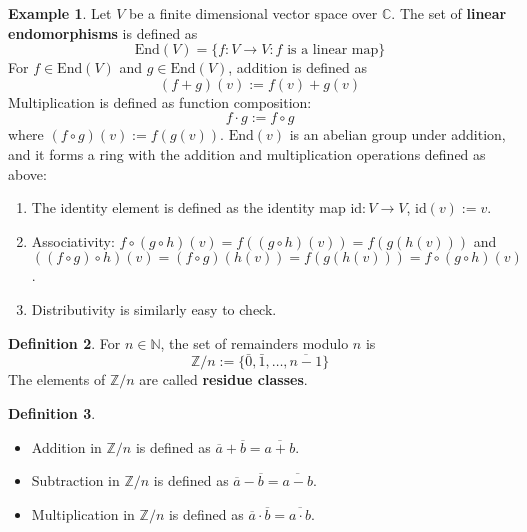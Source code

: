 \documentclass[12pt,a4paper]{article}
\theoremstyle{definition}
\newtheorem{definition}{Definition}[subsection]
\newtheorem{example}[definition]{Example}
\begin{document}
\begin{example}
	Let $V$ be a finite dimensional vector space over $\mathbb{C}$. The set of \textbf{linear endomorphisms} is defined as
	\[
		\text{End}(V) = \{ f: V \rightarrow V : f \text{ is a linear map} \}
	\]
	For $f \in \text{End}(V)$ and $g \in \text{End}(V)$, addition is defined as
	\[
		(f + g)(v) := f(v) + g(v)
	\]
	Multiplication is defined as function composition:
	\[
		f \cdot g := f \circ g
	\]
	where $(f \circ g)(v) := f(g(v))$. $\text{End}(v)$ is an abelian group under addition, and it forms a ring with the addition and multiplication operations defined as above:
	\begin{enumerate}
		\item The identity element is defined as the identity map $\text{id}: V \rightarrow V$, $\text{id}(v) := v$.
		\item Associativity: $f \circ (g \circ h) (v) = f((g \circ h)(v)) = f(g(h(v)))$ and $((f \circ g) \circ h) (v) = (f \circ g) (h(v)) = f(g(h(v))) = f \circ (g \circ h) (v)$.
		\item Distributivity is similarly easy to check.
	\end{enumerate}
\end{example}

\begin{definition}
	For $n \in \mathbb{N}$, the set of remainders modulo $n$ is
	\[
		\mathbb{Z} / n := \{ \bar{0}, \bar{1}, \dots, \overline{n - 1} \}
	\]
	The elements of $\mathbb{Z} / n$ are called \textbf{residue classes}.
\end{definition}

\begin{definition}
	\hfill
	\begin{itemize}
		\item Addition in $\mathbb{Z} / n$ is defined as $\overline{a} + \overline{b} = \overline{a + b}$.
		\item Subtraction in $\mathbb{Z} / n$ is defined as $\overline{a} - \overline{b} = \overline{a - b}$.
		\item Multiplication in $\mathbb{Z} / n$ is defined as $\overline{a} \cdot \overline{b} = \overline{a \cdot b}$.
	\end{itemize}
\end{definition}
\end{document}
